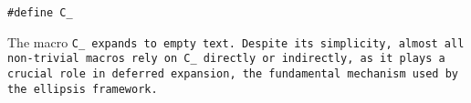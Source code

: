 
\tt{#define C_}


The macro \tt{C_} expands to empty text.
Despite its simplicity, almost all non-trivial macros rely on \tt{C_}
directly or indirectly, as it plays a crucial role in deferred expansion,
the fundamental mechanism used by the ellipsis framework.
